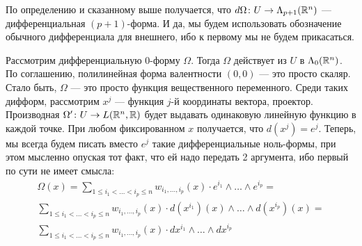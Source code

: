 \begin{note}
	По определению и сказанному выше получается, что $d\Omega \colon U \to \Lambda_{p + 1}(\mathbb{R}^n)$ --- дифференциальная $(p + 1)$-форма. И да, мы будем использовать обозначение обычного дифференциала для внешнего, ибо к первому мы не будем прикасаться.
\end{note}

\begin{note}
	Рассмотрим дифференциальную 0-форму $\Omega$. Тогда $\Omega$ действует из $U$ в $\Lambda_0(\mathbb{R}^n)$. По соглашению, полилинейная форма валентности $(0, 0)$ --- это просто скаляр. Стало быть, $\Omega$ --- это просто функция вещественного переменного. Среди таких дифформ, рассмотрим $x^j$ --- функция $j$-й координаты вектора, проектор. Производная $\Omega' \colon U \to L(\mathbb{R}^n, \mathbb{R})$ будет выдавать одинаковую линейную функцию в каждой точке. При любом фиксированном $x$ получается, что $d(x^j) = e^j$. Теперь, мы всегда будем писать вместо $e^j$ такие дифференциальные ноль-формы, при этом мысленно опуская тот факт, что ей надо передать 2 аргумента, ибо первый по сути не имеет смысла:
	\begin{multline*}
		\Omega(x) = \sum_{1 \le i_1 < \ldots < i_p \le n} w_{i_1, \ldots, i_p}(x) \cdot e^{i_1} \wedge \ldots \wedge e^{i_p} =
		\\
		\sum_{1 \le i_1 < \ldots < i_p \le n} w_{i_1, \ldots, i_p}(x) \cdot d(x^{i_1})(x) \wedge \ldots \wedge d(x^{i_p})(x) =
		\\
		\sum_{1 \le i_1 < \ldots < i_p \le n} w_{i_1, \ldots, i_p}(x) \cdot dx^{i_1} \wedge \ldots \wedge dx^{i_p}
	\end{multline*}
\end{note}

